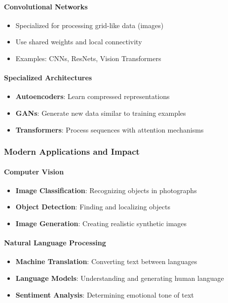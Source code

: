 \paragraph{Convolutional Networks}

\begin{itemize}
\item Specialized for processing grid-like data (images)
\item Use shared weights and local connectivity
\item Examples: CNNs, ResNets, Vision Transformers
\end{itemize}

\paragraph{Specialized Architectures}

\begin{itemize}
\item \textbf{Autoencoders}: Learn compressed representations
\item \textbf{GANs}: Generate new data similar to training examples
\item \textbf{Transformers}: Process sequences with attention mechanisms
\end{itemize}

\subsubsection{Modern Applications and Impact}

\paragraph{Computer Vision}

\begin{itemize}
\item \textbf{Image Classification}: Recognizing objects in photographs
\item \textbf{Object Detection}: Finding and localizing objects
\item \textbf{Image Generation}: Creating realistic synthetic images
\end{itemize}

\paragraph{Natural Language Processing}

\begin{itemize}
\item \textbf{Machine Translation}: Converting text between languages
\item \textbf{Language Models}: Understanding and generating human language
\item \textbf{Sentiment Analysis}: Determining emotional tone of text
\end{itemize}

